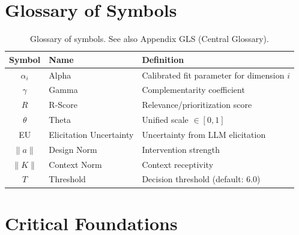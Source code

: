 \section{Glossary of Symbols}
\label{sec:iii-glossary}

\begin{table}[h]
\centering
\begin{tabular}{clp{8cm}}
\toprule
\textbf{Symbol} & \textbf{Name} & \textbf{Definition} \\
\midrule
$\alpha_i$ & Alpha & Calibrated fit parameter for dimension $i$ \\
$\gamma$ & Gamma & Complementarity coefficient \\
$R$ & R-Score & Relevance/prioritization score \\
$\theta$ & Theta & Unified scale $\in [0,1]$ \\
EU & Elicitation Uncertainty & Uncertainty from LLM elicitation \\
$\|a\|$ & Design Norm & Intervention strength \\
$\|K\|$ & Context Norm & Context receptivity \\
$T$ & Threshold & Decision threshold (default: 6.0) \\
\bottomrule
\end{tabular}
\caption{Glossary of symbols. See also Appendix GLS (Central Glossary).}
\end{table}


\section{Critical Foundations}
\label{sec:iii-foundations}

